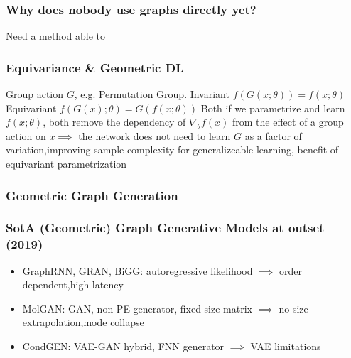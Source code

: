 \documentclass[./presentation.tex]{subfiles}
\begin{document}
\begin{frame}[label=working]
  \frametitle{Why does nobody use graphs directly yet? 
  }
Need a method able to 
\begin{itemize}
\end{itemize}
\end{frame}
\begin{frame}[label=working]
  \frametitle{Equivariance \& Geometric DL}
  Group action $G$, e.g. Permutation Group.
  Invariant $f(G(x;\theta))=f(x;\theta)$
  Equivariant $f(G(x);\theta)=G(f(x;\theta))$
  Both if we parametrize and learn $f(x;\theta)$, both remove the dependency of $\nabla_\theta f(x)$ from the effect of a group action on $x$$\implies$ the network does not need to learn $G$ as a factor of variation,improving sample complexity for generalizeable learning\citep{elesedyProvablyStrictGeneralisation2021b}, benefit of equivariant parametrization
\end{frame}
\begin{frame}[label=working,t]
  \frametitle{Geometric Graph Generation}
  
\end{frame}
\begin{frame}[label=working]
  \frametitle{SotA (Geometric) Graph Generative Models at outset (2019)}
  \begin{itemize}
    \item GraphRNN, GRAN, BiGG: autoregressive likelihood $\implies$ order dependent,high latency%
    \item MolGAN: GAN, non PE generator, fixed size matrix  $\implies$ no size extrapolation,mode collapse
    \item CondGEN: VAE-GAN hybrid, FNN generator $\implies$ VAE limitations \citep{bousquetOptimalTransportGenerative2017a, genevayGANVAEOptimal2017e}%
  \end{itemize}
\end{frame}
\end{document}
